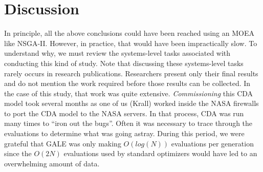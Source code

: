 \documentclass[journal]{IEEEtran}
\newcommand{\fig}[1]{Figure~\ref{fig:#1}}
\begin{document}



\section{Discussion}

In principle, all the above conclusions could have been reached using an MOEA like NSGA-II. 
However, in practice, that would have been impractically slow. 
To understand why, we must review the systems-level tasks associated with conducting this kind of study.
Note that discussing these systems-level tasks rarely occurs in research publications. 
Researchers present only their final results and do not mention the work required before those results can be collected. 
In the case of this study, that work was quite extensive.  
{\em Commissioning} this CDA model took several months as one of us (Krall) worked inside the NASA firewalls to port the CDA model to the NASA servers. 
In that process, CDA was run many times to ``iron out the bugs''.  
Often it was necessary to trace through the evaluations to determine what was
going astray. 
During this period, we were grateful that GALE was only making $O(log(N))$ evaluations per generation since the $O(2N)$ evaluations used by standard optimizers would have led to an overwhelming amount of data.
\end{document}
